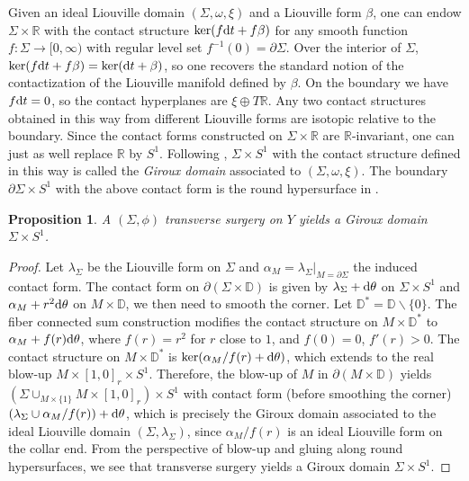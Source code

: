 \documentclass[11pt]{amsart}
\numberwithin{equation}{section}
\newtheorem{proposition}[theorem]{\textbf{Proposition}}
\def\R{\mathbb{R}}
\def\D{{\mathbb D}}
\def\rd{{\rm d}}
\begin{document}
Given an ideal Liouville domain $(\Sigma,\omega,\xi)$ and a Liouville form $\beta$, one can endow $\Sigma\times \R$ with the contact structure $\ker(f \rd t +f \beta)$ for any smooth function $f:\Sigma\to[0,\infty)$ with regular level set $f^{-1}(0) = \partial \Sigma$. Over the interior of $\Sigma$, $\ker(f \rd t +f\beta)=\ker(\rd t +\beta)$, so one recovers the standard notion of the contactization of the Liouville manifold defined by $\beta$. On the boundary we have $f\rd t=0$, so the contact hyperplanes are $\xi \oplus T\R$. Any two contact structures obtained in this way from different Liouville forms are isotopic relative to the boundary. Since the contact forms constructed on $\Sigma \times \R$ are $\R$-invariant, one can just as well replace $\R$ by $S^1$. Following \cite[\S 5.3]{MNW}, $\Sigma\times S^1$ with the contact structure defined in this way is called the \emph{Giroux domain} associated to $(\Sigma,\omega,\xi)$. The boundary $\partial \Sigma \times S^1$ with the above contact form is the round hypersurface in \cite[\S 4.1]{MNW}. 

\begin{proposition}\label{prop:transverse_Giroux}
    A $(\Sigma,\phi)$ transverse surgery on $Y$ yields a Giroux domain $\Sigma \times S^1$.
\end{proposition}
\begin{proof}
Let $\lambda_{\Sigma}$ be the Liouville form on $\Sigma$ and $\alpha_M=\lambda_{\Sigma}|_{M=\partial \Sigma}$ the induced contact form. The contact form on $\partial(\Sigma \times \D)$ is given by $\lambda_{\Sigma}+\rd \theta$ on $\Sigma \times S^1$ and $\alpha_M+r^2\rd \theta$ on $M\times \D$, we then need to smooth the corner. Let $\D^*=\D\backslash\{0\}$. The fiber connected sum construction modifies the contact structure on $M\times \D^*$ to $\alpha_M+f(r)\rd \theta$, where $f(r)=r^2$ for $r$ close to $1$, and $f(0)=0$, $f'(r)>0$. The contact structure on $M\times \D^*$ is $\ker (\alpha_M/f(r)+\rd \theta)$, which extends to the real blow-up $M\times [1,0]_r\times S^1$. Therefore, the blow-up of $M$ in $\partial(M\times \D)$ yields $(\Sigma\cup_{M\times \{1\}} M\times [1,0]_r)\times S^1$ with contact form (before smoothing the corner) $(\lambda_{\Sigma}\cup\alpha_M/f(r))+\rd\theta$, which is precisely the Giroux domain associated to the ideal Liouville domain $(\Sigma,\lambda_{\Sigma})$, since $\alpha_M/f(r)$ is an ideal Liouville form on the collar end. From the perspective of blow-up and gluing along round hypersurfaces, we see that transverse surgery yields a Giroux domain $\Sigma \times S^1$.
\end{proof}
\end{document}
